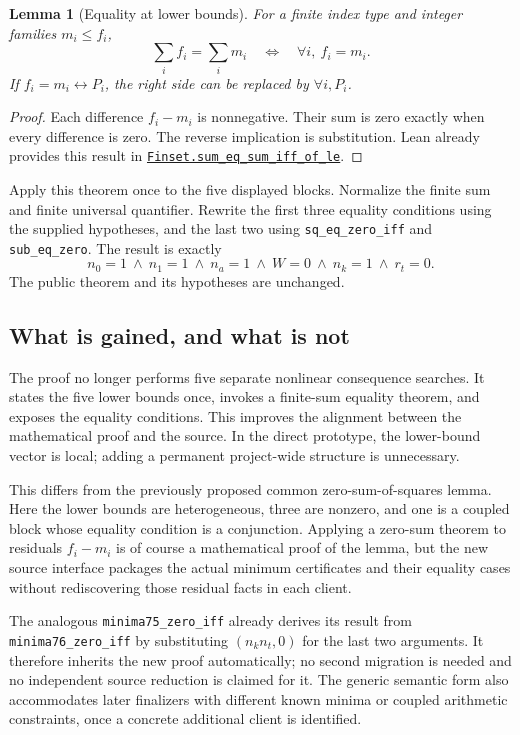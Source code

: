\documentclass[11pt,letterpaper]{article}
\newcommand{\code}[1]{\nolinkurl{#1}}
\newcommand{\mathsrc}[2]{\href{https://github.com/leanprover-community/mathlib4/blob/81a5d257c8e410db227a6665ed08f64fea08e997/Mathlib/#1.lean}{#2}}
\newtheorem{lemma}[proposition]{Lemma}
\begin{document}
\begin{lemma}[Equality at lower bounds]
For a finite index type and integer families $m_i\le f_i$,
\[
 \sum_i f_i=\sum_i m_i\quad\Longleftrightarrow\quad
 \forall i,\ f_i=m_i.
\]
If $f_i=m_i\leftrightarrow P_i$, the right side can be replaced by $\forall i,P_i$.
\end{lemma}
\begin{proof}
Each difference $f_i-m_i$ is nonnegative. Their sum is zero exactly when every difference is zero. The reverse implication is substitution. Lean already provides this result in \mathsrc{Algebra/Order/BigOperators/Group/Finset}{\code{Finset.sum_eq_sum_iff_of_le}}.
\end{proof}

Apply this theorem once to the five displayed blocks. Normalize the finite sum and finite universal quantifier. Rewrite the first three equality conditions using the supplied hypotheses, and the last two using \code{sq_eq_zero_iff} and \code{sub_eq_zero}. The result is exactly
\[
 n_0=1\ \land\ n_1=1\ \land\ n_a=1\ \land\ W=0
 \ \land\ n_k=1\ \land\ r_t=0.
\]
The public theorem and its hypotheses are unchanged.

\subsection{What is gained, and what is not}

The proof no longer performs five separate nonlinear consequence searches. It states the five lower bounds once, invokes a finite-sum equality theorem, and exposes the equality conditions. This improves the alignment between the mathematical proof and the source. In the direct prototype, the lower-bound vector is local; adding a permanent project-wide structure is unnecessary.

This differs from the previously proposed common zero-sum-of-squares lemma. Here the lower bounds are heterogeneous, three are nonzero, and one is a coupled block whose equality condition is a conjunction. Applying a zero-sum theorem to residuals $f_i-m_i$ is of course a mathematical proof of the lemma, but the new source interface packages the actual minimum certificates and their equality cases without rediscovering those residual facts in each client.

The analogous \code{minima75_zero_iff} already derives its result from \code{minima76_zero_iff} by substituting $(n_k n_t,0)$ for the last two arguments. It therefore inherits the new proof automatically; no second migration is needed and no independent source reduction is claimed for it. The generic semantic form also accommodates later finalizers with different known minima or coupled arithmetic constraints, once a concrete additional client is identified.
\end{document}
